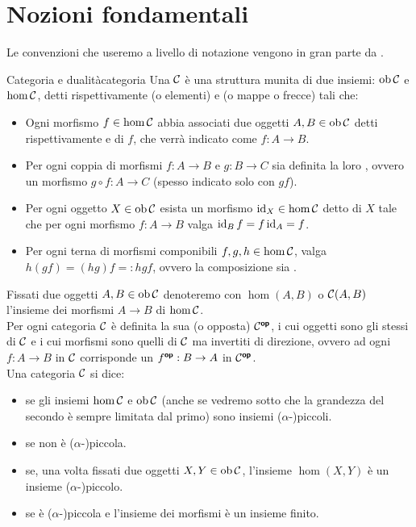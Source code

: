 \documentclass[openany]{book}
\renewcommand\C{\mc{C}}
\begin{document}
\newpage
\section{Nozioni fondamentali}

Le convenzioni che useremo a livello di notazione vengono in gran parte da \cite{Riehl2017}.

\begin{definition}{Categoria e dualità}{categoria}
    Una  $\C$ è una struttura munita di due insiemi: $\ob\C$ e $\hom\C$, detti rispettivamente  (o elementi) e  (o mappe o frecce) tali che: \begin{itemize}
        \item Ogni morfismo $f \in \hom\C$ abbia associati due oggetti $A,B \in \ob\C$ detti rispettivamente  e  di $f$, che verrà indicato come $f : A\to B$.
        \item Per ogni coppia di morfismi $f:A\to B$ e $g : B\to C$ sia definita la loro , ovvero un morfismo $g\circ f : A \to C$ (spesso indicato solo con $gf$).
        \item Per ogni oggetto $X \in \ob\C$ esista un morfismo $\id_X \in \hom\C$ detto  di $X$ tale che per ogni morfismo $f:A\to B$ valga $\operatorname{id}_B f = f \operatorname{id}_A = f$.
        \item Per ogni terna di morfismi componibili $f,g,h \in \hom\C$, valga $h(gf) = (hg)f =: hgf$, ovvero la composizione sia .
    \end{itemize}
    Fissati due oggetti $A,B \in \ob\C$ denoteremo con $\hom(A,B)$ o $\C(A,B)$ l'insieme dei morfismi $A\to B$ di $\hom\C$.\\
    Per ogni categoria $\C$ è definita la sua  (o opposta) $\C^\op$, i cui oggetti sono gli stessi di $\C$ e i cui morfismi sono quelli di $\C$ ma invertiti di direzione, ovvero ad ogni $f:A\to B$ in $\C$ corrisponde un $f^{\text{\sffamily\textbf{op}}} : B\to A$ in $\C^\op$.\\
    Una categoria $\C$ si dice:\begin{itemize}
        \item {} se gli insiemi $\hom\C$ e $\ob\C$ (anche se vedremo sotto che la grandezza del secondo è sempre limitata dal primo) sono insiemi ($\alpha$-)piccoli.
        \item {} se non è ($\alpha$-)piccola.
        \item {} se, una volta fissati due oggetti $X,Y \in \ob\C$, l'insieme $\hom(X,Y)$ è un insieme ($\alpha$-)piccolo.
        \item {} se è ($\alpha$-)piccola e l'insieme dei morfismi è un insieme finito.
    \end{itemize}
\end{definition}
\end{document}
